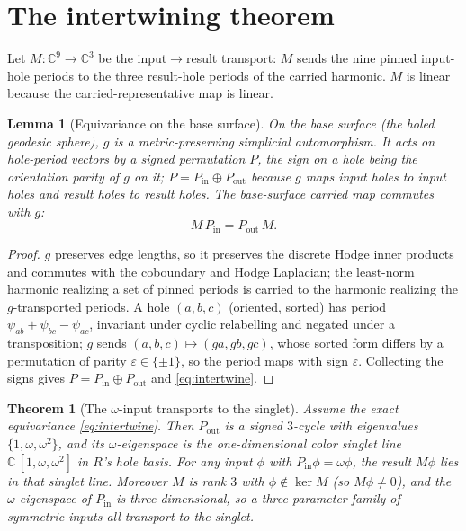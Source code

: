 \documentclass[11pt]{article}
\newtheorem{theorem}{Theorem}
\newtheorem{lemma}{Lemma}
\theoremstyle{definition}
\newcommand{\C}{\mathbb{C}}
\newcommand{\Pin}{P_{\mathrm{in}}}
\newcommand{\Pout}{P_{\mathrm{out}}}
\begin{document}
\section{The intertwining theorem}
\label{sec:theorem}

Let $M:\C^9\to\C^3$ be the input$\to$result transport: $M$ sends the nine pinned
input-hole periods to the three result-hole periods of the carried harmonic. $M$ is
linear because the carried-representative map is linear.

\begin{lemma}[Equivariance on the base surface]
\label{lem:equivariant}
On the base surface (the holed geodesic sphere), $g$ is a metric-preserving simplicial
automorphism. It acts on hole-period vectors by a signed permutation $P$, the sign on a
hole being the orientation parity of $g$ on it; $P=\Pin\oplus\Pout$ because $g$ maps
input holes to input holes and result holes to result holes. The base-surface carried
map commutes with $g$:
\begin{equation}
  M\,\Pin = \Pout\,M .
  \label{eq:intertwine}
\end{equation}
\end{lemma}

\begin{proof}
$g$ preserves edge lengths, so it preserves the discrete Hodge inner products and
commutes with the coboundary and Hodge Laplacian; the least-norm harmonic realizing a
set of pinned periods is carried to the harmonic realizing the $g$-transported
periods. A hole $(a,b,c)$ (oriented, sorted) has period $\psi_{ab}+\psi_{bc}-\psi_{ac}$,
invariant under cyclic relabelling and negated under a transposition; $g$ sends
$(a,b,c)\mapsto(ga,gb,gc)$, whose sorted form differs by a permutation of parity
$\varepsilon\in\{\pm1\}$, so the period maps with sign $\varepsilon$. Collecting the
signs gives $P=\Pin\oplus\Pout$ and \eqref{eq:intertwine}.
\end{proof}

\begin{theorem}[The $\omega$-input transports to the singlet]
\label{thm:singlet}
Assume the exact equivariance \eqref{eq:intertwine}. Then $\Pout$ is a signed
$3$-cycle with eigenvalues $\{1,\omega,\omega^2\}$, and its $\omega$-eigenspace is the
one-dimensional color singlet line $\C\,[1,\omega,\omega^2]$ in $R$'s hole basis. For
any input $\phi$ with $\Pin\phi=\omega\phi$, the result $M\phi$ lies in that singlet
line. Moreover $M$ is rank $3$ with $\phi\notin\ker M$ (so $M\phi\neq 0$), and the
$\omega$-eigenspace of $\Pin$ is three-dimensional, so a three-parameter family of
symmetric inputs all transport to the singlet.
\end{theorem}
\end{document}
